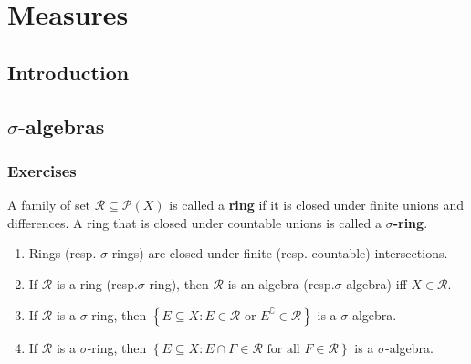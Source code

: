 \chapter{Measures}

\section{Introduction}

\section{\(\sigma\)-algebras}

\subsection*{Exercises}

\begin{exercise}
    A family of set \( \mathcal{R} \subseteq \mathcal{P}(X) \) is called a \textbf{ring} if it is closed under finite unions and differences. A ring that is closed under countable unions is called a \textbf{\(\sigma\)-ring}.
    \begin{enumerate}[itemsep=0pt,label=\textbf{\alph*.}]
        \item Rings (resp\@. \(\sigma\)-rings) are closed under finite (resp\@. countable) intersections.
        \item If \( \mathcal{R} \) is a ring (resp.\@ \(\sigma\)-ring), then \( \mathcal{R} \) is an algebra (resp.\@ \(\sigma\)-algebra) iff \( X \in \mathcal{R} \).
        \item If \( \mathcal{R} \) is a \( \sigma \)-ring, then \( \left\{ E \subseteq X : E \in \mathcal{R} \text{ or } E^{\complement} \in \mathcal{R} \right\} \) is a \( \sigma \)-algebra.
        \item If \( \mathcal{R} \) is a \( \sigma \)-ring, then \( \left\{ E \subseteq X: E \cap F \in \mathcal{R} \text{ for all } F \in \mathcal{R} \right\} \) is a \( \sigma \)-algebra.
    \end{enumerate}
\end{exercise}

